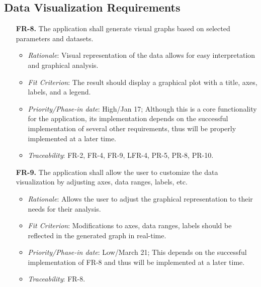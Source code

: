 \documentclass[12pt]{article}
\begin{document}
\subsection{Data Visualization Requirements}
\begin{enumerate}
  \item[\textbf{FR-8.}] The application shall generate visual graphs based on selected parameters and datasets.
  \begin{itemize}
    \item \textit{Rationale}: Visual representation of the data allows for easy interpretation and graphical analysis.
    \item \textit{Fit Criterion}: The result should display a graphical plot with a title, axes, labels, and a legend.
    \item \textit{Priority/Phase-in date}: High/Jan 17; Although this is a core functionality for the application, its implementation depends on the successful implementation of several other requirements, thus will be properly implemented at a later time.
    \item \textit{Traceability}: FR-2, FR-4, FR-9, LFR-4, PR-5, PR-8, PR-10.
  \end{itemize}
  \item[\textbf{FR-9.}] The application shall allow the user to customize the data visualization by adjusting axes, data ranges, labels, etc.
  \begin{itemize}
    \item \textit{Rationale}: Allows the user to adjust the graphical representation to their needs for their analysis.
    \item \textit{Fit Criterion}: Modifications to axes, data ranges, labels should be reflected in the generated graph in real-time.
    \item \textit{Priority/Phase-in date}: Low/March 21; This depends on the successful implementation of FR-8 and thus will be implemented at a later time.
    \item \textit{Traceability}: FR-8.
  \end{itemize}
\end{enumerate}
\end{document}
